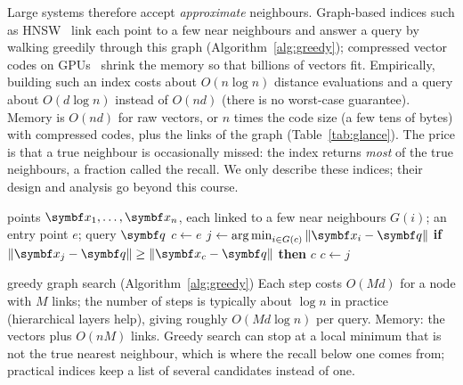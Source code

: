 \documentclass[11pt]{article}
\begin{document}
Large systems therefore accept \emph{approximate} neighbours. Graph-based indices such as HNSW~\cite{malkov2020}
link each point to a few near neighbours and answer a query by walking greedily through this graph
(Algorithm~\ref{alg:greedy}); compressed vector codes on GPUs~\cite{johnson2021} shrink the memory so that billions of
vectors fit. Empirically, building such an index costs about $O(n \log n)$ distance evaluations and a query about
$O(d \log n)$ instead of $O(nd)$ (there is no worst-case guarantee). Memory is $O(nd)$ for raw vectors, or $n$ times
the code size (a few tens of bytes) with compressed codes, plus the links of the graph (Table~\ref{tab:glance}). The
price is that a true neighbour is occasionally missed: the index returns \emph{most} of the true neighbours, a
fraction called the recall. We only describe these indices; their design and analysis go beyond this course.

\begin{algorithm}[htbp]
\caption{Greedy search in a neighbour graph (the core step of graph-based indices)}
\label{alg:greedy}
\begin{algorithmic}[1]
\Require points $\x_1, \dots, \x_n$, each linked to a few near neighbours $G(i)$; an entry point $e$; query $\vect{q}$
\State $c \gets e$
\Loop
  \State $j \gets \argmin_{i \in G(c)} \norm{\x_i - \vect{q}}$ 
  \State \textbf{if} $\norm{\x_j - \vect{q}} \ge \norm{\x_c - \vect{q}}$ \textbf{then} \Return $c$
  \State $c \gets j$
\EndLoop
\end{algorithmic}
\end{algorithm}

\begin{runtime}{greedy graph search (Algorithm~\ref{alg:greedy})}
Each step costs $O(Md)$ for a node with $M$ links; the number of steps is typically about $\log n$ in practice
(hierarchical layers help), giving roughly $O(Md \log n)$ per query. Memory: the vectors plus $O(nM)$ links.
Greedy search can stop at a local minimum that is not the true nearest neighbour, which is where the recall below one
comes from; practical indices keep a list of several candidates instead of one.
\end{runtime}
\end{document}
